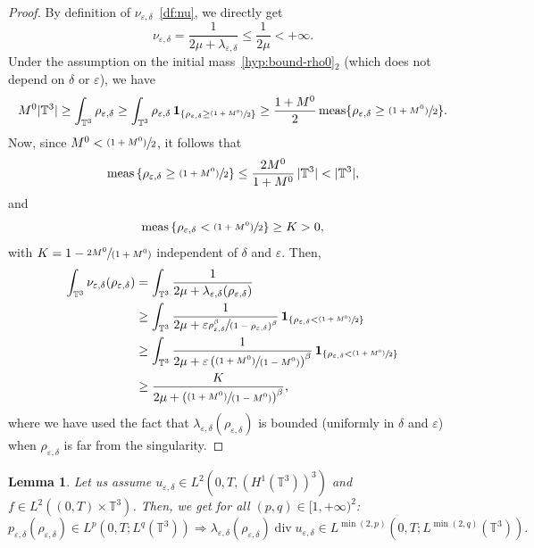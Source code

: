 \documentclass[JEP,XML,SOM,Unicode,NoEqCountersInSection]{cedram}
\newcommand{\<}{\bigl\langle}
\renewcommand{\>}{\bigr\rangle}
\newcommand{\psfrac}[2]{\sfrac{(#1)}{#2}}
\newcommand{\spfrac}[2]{\sfrac{#1}{(#2)}}
\newcommand{\pspfrac}[2]{\sfrac{(#1)}{(#2)}}
\DeclareMathOperator{\meas}{meas}
\newtheorem{lem}[thm]{Lemma}
\theoremstyle{definition}
\theoremstyle{remark}
\newcommand{\TT}{\mathbb{T}^3}
\DeclareMathOperator{\Div}{div}
\let\ep\varepsilon
\begin{document}
\begin{proof} By definition of $\nu_{\ep,\delta}$~\eqref{df:nu}, we directly get
\[
\nu_{\ep,\delta} = \dfrac{1}{2\mu + \lambda_{\ep,\delta}} \leq \dfrac{1}{2\mu} < +\infty.
\]
Under the assumption on the initial mass~\eqref{hyp:bound-rho0}${}_2$ (which does not depend on $\delta$ or $\ep$), we have
\[
M^0 |\TT|
\geq \int_{\TT}{\rho_{\ep,\delta}} \geq \int_{\TT}{\rho_{\ep,\delta} \,\mathbf{1}_{\{\rho_{\ep,\delta} \geq \psfrac{1+M^0}{2}\}} }
\geq \dfrac{1+M^0}{2} \meas\{\rho_{\ep,\delta} \geq \psfrac{1+M^0}{2}\}.
\]
Now, since $ M^0 < \psfrac{1+M^0}{2 }$, it follows that
\begin{equation*}
\meas \left\{ \rho_{\ep,\delta} \geq \psfrac{1+M^0}{2} \right\} \leq \dfrac{2M^0}{1+M^0}\,|\TT| < |\TT|,
\end{equation*}
and
\begin{equation*}
\meas \left\{ \rho_{\ep,\delta} < \psfrac{1+M^0}{2} \right\} \geq K > 0,
\end{equation*}
with $K = 1- \spfrac{2M^0}{1+M^0}$ independent of $\delta$ and $\ep$.
Then,
\begin{align*}
\int_{\TT}{\nu_{\ep,\delta}(\rho_{\ep,\delta})}
& = \int_{\TT}{\dfrac{1}{2\mu + \lambda_{\ep,\delta}(\rho_{\ep,\delta})} }\\
& \geq \int_{\TT}{\dfrac{1}{2\mu + \ep \sfrac{\rho_{\ep,\delta}^\beta}{(1-\rho_{\ep,\delta})^\beta}}\,\mathbf{1}_{\{ \rho_{\ep,\delta} < \psfrac{1+M^0}{2} \}} } \\
& \geq \int_{\TT}{\dfrac{1}{2\mu + \ep \left(\pspfrac{1+M^0}{1-M^0}\right)^\beta }\,\mathbf{1}_{\{ \rho_{\ep,\delta} < \psfrac{1+M^0}{2} \}} }\\
& \geq \dfrac{K}{2\mu + \left(\pspfrac{1+M^0}{1-M^0}\right)^\beta},
\end{align*}
where we have used the fact that $\lambda_{\ep,\delta}(\rho_{\ep,\delta})$ is bounded (uniformly in $\delta$ and $\ep$) when $\rho_{\ep,\delta}$ is far from the singularity.
\end{proof}

\begin{lem}{\label{lambdadivu}} Let us assume $u_{\ep,\delta} \in L^2(0,T,(H^1(\TT))^3)$ and $f \in L^2((0,T) \times \TT)$.
Then, we get for all $(p,q) \in [1,+\infty)^2$:
\[
p_{\varepsilon,\delta} (\rho_{\varepsilon,\delta}) \in L^p (0,T;L^q(\TT))
\Longrightarrow 
\lambda_{\varepsilon, \delta}
(\rho_{\varepsilon,\delta}) \Div u_{\varepsilon,\delta} \in L^{\min{(2,p)}}(0,T;L^{\min(2,q)}(\TT)).
\]
\end{lem}
\end{document}
